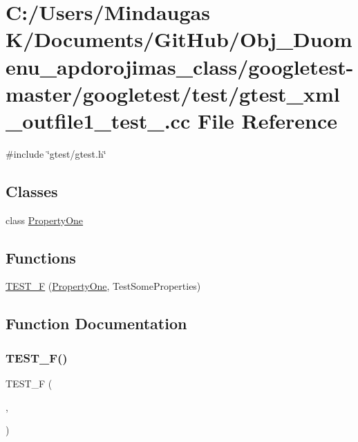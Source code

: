 \hypertarget{googletest-master_2googletest_2test_2gtest__xml__outfile1__test___8cc}{}\section{C\+:/\+Users/\+Mindaugas K/\+Documents/\+Git\+Hub/\+Obj\+\_\+\+Duomenu\+\_\+apdorojimas\+\_\+class/googletest-\/master/googletest/test/gtest\+\_\+xml\+\_\+outfile1\+\_\+test\+\_\+.cc File Reference}
\label{googletest-master_2googletest_2test_2gtest__xml__outfile1__test___8cc}
{\ttfamily \#include \char`\"{}gtest/gtest.\+h\char`\"{}}\newline
\subsection*{Classes}
\begin{DoxyCompactItemize}
\item 
class \mbox{\hyperlink{class_property_one}{Property\+One}}
\end{DoxyCompactItemize}
\subsection*{Functions}
\begin{DoxyCompactItemize}
\item 
\mbox{\hyperlink{googletest-master_2googletest_2test_2gtest__xml__outfile1__test___8cc_a332e6b360a7975e161b4f4b1e34e2d33}{T\+E\+S\+T\+\_\+F}} (\mbox{\hyperlink{class_property_one}{Property\+One}}, Test\+Some\+Properties)
\end{DoxyCompactItemize}


\subsection{Function Documentation}
\mbox{\label{googletest-master_2googletest_2test_2gtest__xml__outfile1__test___8cc_a332e6b360a7975e161b4f4b1e34e2d33}} 
\subsubsection{\texorpdfstring{TEST\_F()}{TEST\_F()}}
{\footnotesize\ttfamily T\+E\+S\+T\+\_\+F (\begin{DoxyParamCaption}\item[{\mbox{\hyperlink{class_property_one}{Property\+One}}}]{,  }\item[{Test\+Some\+Properties}]{ }\end{DoxyParamCaption})}

